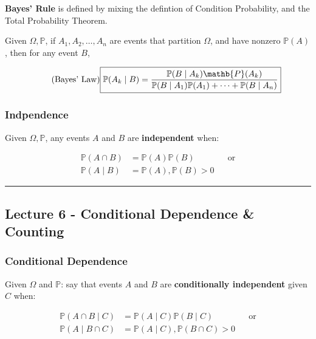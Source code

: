 \documentclass{article}
\begin{document}
\textbf{Bayes' Rule} is defined by mixing the defintion of Condition
Probability, and the Total Probability Theorem.

Given $\Omega, \mathbb{P}$, if $A_1, A_2, \dots, A_n$ are events that
partition $\Omega$, and have nonzero $\mathbb{P}(A)$, then for any
event $B$,

\begin{equation}
  \tag{Bayes' Law}
  \boxed{
    \mathbb{P}(A_k \mid B) =
    \frac{\mathbb{P}(B \mid A_k) \mathb{P}(A_k)}
    {\mathbb{P}(B \mid A_1) \mathbb{P}(A_1) + \dots + \mathbb{P}(B
      \mid A_n)}
  }
\end{equation}

\subsubsection{Indpendence}

Given $\Omega, \mathbb{P}$, any events $A$ and $B$ are
\textbf{independent} when:

\begin{equation}
  \tag{Independence Def}
  \boxed{
    \begin{aligned}
      \mathbb{P}(A \cap B)
      &= \mathbb{P}(A) \mathbb{P}(B)
      && \text{or} \\
      \mathbb{P}(A \mid B)
      &= \mathbb{P}(A), \mathbb{P}(B) > 0
    \end{aligned}
  }
\end{equation}


\medskip\hrule
\subsection{Lecture 6 - Conditional Dependence \& Counting}

\subsubsection{Conditional Dependence}

Given $\Omega$ and $\mathbb{P}$: say that events $A$ and $B$ are
\textbf{conditionally independent} given $C$ when:

\begin{equation}
  \tag{Conditional Independence Def}
  \boxed{
    \begin{aligned}
      \mathbb{P}(A \cap B \mid C)
      &= \mathbb{P}(A \mid C) \mathbb{P}(B \mid C)
      && \text{or} \\
      \mathbb{P}(A \mid B \cap C)
      &= \mathbb{P}(A \mid C), \mathbb{P}(B \cap C) > 0
    \end{aligned}
  }
\end{equation}
\end{document}
